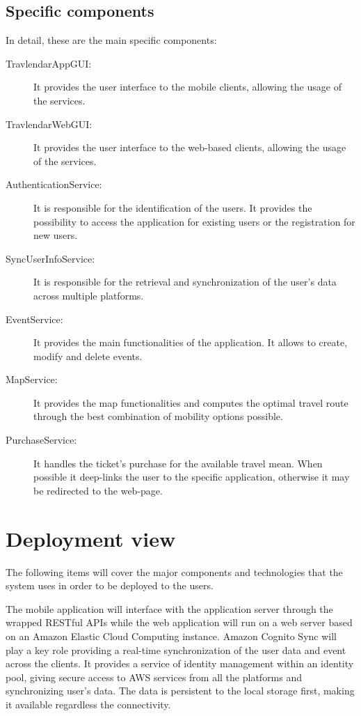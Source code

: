 \subsection*{Specific components}
In detail, these are the main specific components:
\begin{description}
	\item[TravlendarAppGUI:] It provides the user interface to the mobile clients, allowing the usage of the services.
	\item[TravlendarWebGUI:] It provides the user interface to the web-based clients, allowing the usage of the services.
	\item[AuthenticationService:] It is responsible for the identification of the users. It provides the possibility to access the application for existing users or the registration for new users.
	\item[SyncUserInfoService:] It is responsible for the retrieval and synchronization of the user's data across multiple platforms.
	\item[EventService:] It provides the main functionalities of the application. It allows to create, modify and delete events.
	\item[MapService:] It provides the map functionalities and computes the optimal travel route through the best combination of mobility options possible.
	\item[PurchaseService:] It handles the ticket's purchase for the available travel mean. When possible it deep-links the user to the specific application, otherwise it may be redirected to the web-page.
\end{description}

\section{Deployment view}
\label{sec:depl_view}
The following items will cover the major components and technologies that the system uses in order to be deployed to the users.

The mobile application will interface with the application server through the wrapped RESTful APIs while the web application will run on a web server based on an Amazon Elastic Cloud Computing instance.
Amazon Cognito Sync will play a key role providing a real-time synchronization of the user data and event across the clients.
It provides a service of identity management within an identity pool, giving secure access to AWS services from all the platforms and synchronizing user's data. 
The data is persistent to the local storage first, making it available regardless the connectivity.


